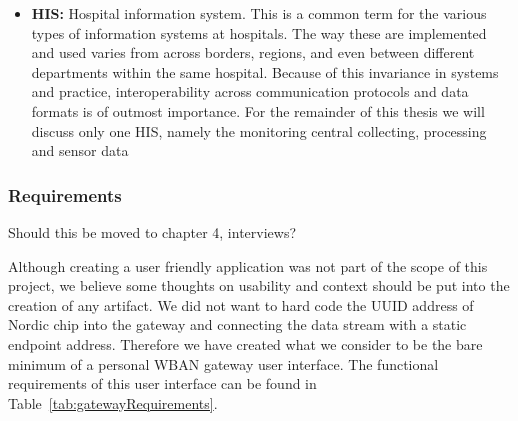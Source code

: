 \begin{itemize}
  \item \textbf{HIS:} Hospital information system. This is a common term for the various types of information systems at hospitals. The way these are implemented and used varies from across borders, regions, and even between different departments within the same hospital. Because of this invariance in systems and practice, interoperability across communication protocols and data formats is of outmost importance. For the remainder of this thesis we will discuss only one HIS, namely the monitoring central collecting, processing and  sensor data 

\end{itemize}


\subsubsection{Requirements} %
\label{ssub:requirements}
Should this be moved to chapter 4, interviews?

Although creating a user friendly application was not part of the scope of this project, we believe some thoughts on usability and context should be put into the creation of any artifact. We did not want to hard code the UUID address of Nordic chip into the gateway and connecting the data stream with a static endpoint address. Therefore we have created what we consider to be the bare minimum of a personal WBAN gateway user interface. The functional requirements of this user interface can be found in Table~\ref{tab:gatewayRequirements}.


